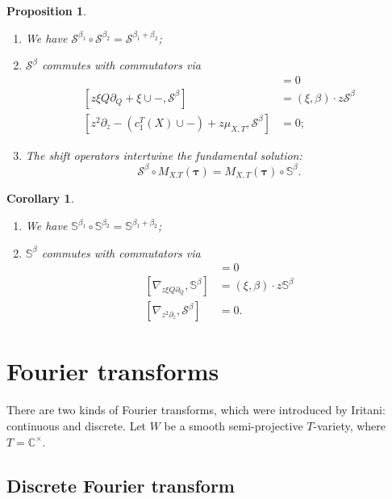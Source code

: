 \documentclass{amsart}
\newtheorem{cor}[thm]{Corollary}
\newtheorem{prop}[thm]{Proposition}
\theoremstyle{definition}
\theoremstyle{remark}
\theoremstyle{plain}
\theoremstyle{definition}
\theoremstyle{remark}
\newcommand{\C}{\mathbb{C}}
\newcommand{\bS}{\mathbb{S}}
\renewcommand{\mc}[1]{\mathcal{#1}}
\newcommand{\btau}{\symbf{\tau}}
\newcommand{\1}{\mathbf{1}}
\newcommand{\2}{\mathbf{2}}
\newcommand{\3}{\mathbf{3}}
\begin{document}
\begin{prop}\leavevmode
    \begin{enumerate}
        \item We have \(\mc{S}^{\beta_1} \circ \mc{S}^{\beta_2} = \mc{S}^{\beta_1 + \beta_2}\);
        \item \(\mc{S}^{\beta}\) commutes with commutators via
        \begin{align*}
            [z\partial_{\tau^i}, \mc{S}^{\beta}] &= 0 \\
            [z \xi Q \partial_Q + \xi \cup -, \mc{S}^{\beta}] &= (\xi, \beta) \cdot z \mc{S}^{\beta} \\
            [z^2 \partial_z - (c_1^T(X) \cup -) + z \mu_{X,T}, \mc{S}^{\beta}] &= 0;
        \end{align*}
        \item The shift operators intertwine the fundamental solution:
        \[ \mc{S}^{\beta} \circ M_{X. T}(\btau) = M_{X, T}(\btau) \circ \bS^{\beta}. \]
    \end{enumerate}
\end{prop}

\begin{cor}\leavevmode
    \begin{enumerate}
        \item We have \(\bS^{\beta_1} \circ \bS^{\beta_2} = \bS^{\beta_1 + \beta_2}\);
        \item \(\bS^{\beta}\) commutes with commutators via
        \begin{align*}
            [\nabla_{\partial_{\tau^i}}, \bS^{\beta}] &= 0 \\
            [\nabla_{z \xi Q \partial_Q}, \bS^{\beta}] &= (\xi, \beta) \cdot z \bS^{\beta} \\
            [\nabla_{z^2 \partial_z}, \mc{S}^{\beta}] &= 0.
        \end{align*}
    \end{enumerate}
\end{cor}

\section{Fourier transforms}%
\label{sec:Fourier transforms}

There are two kinds of Fourier transforms, which were introduced by Iritani: continuous and discrete. Let \(W\) be a smooth semi-projective \(T\)-variety, where \(T = \C^{\times}\).

\subsection{Discrete Fourier transform}%
\label{sub:Discrete Fourier transform}
\end{document}
